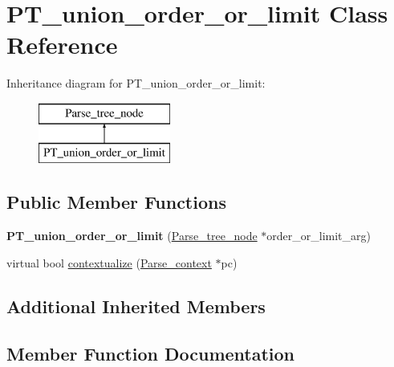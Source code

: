 \hypertarget{classPT__union__order__or__limit}{}\section{P\+T\+\_\+union\+\_\+order\+\_\+or\+\_\+limit Class Reference}
\label{classPT__union__order__or__limit}
Inheritance diagram for P\+T\+\_\+union\+\_\+order\+\_\+or\+\_\+limit\+:\begin{figure}[H]
\begin{center}
\leavevmode
\includegraphics[height=2.000000cm]{classPT__union__order__or__limit}
\end{center}
\end{figure}
\subsection*{Public Member Functions}
\begin{DoxyCompactItemize}
\item 
\mbox{\label{classPT__union__order__or__limit_a85b711d64ff04e855f54aa8a1fc4af20}} 
{\bfseries P\+T\+\_\+union\+\_\+order\+\_\+or\+\_\+limit} (\mbox{\hyperlink{classParse__tree__node}{Parse\+\_\+tree\+\_\+node}} $\ast$order\+\_\+or\+\_\+limit\+\_\+arg)
\item 
virtual bool \mbox{\hyperlink{classPT__union__order__or__limit_a3dea915c0edc923859fc01ad2dd16c5a}{contextualize}} (\mbox{\hyperlink{structParse__context}{Parse\+\_\+context}} $\ast$pc)
\end{DoxyCompactItemize}
\subsection*{Additional Inherited Members}


\subsection{Member Function Documentation}
\mbox{\label{classPT__union__order__or__limit_a3dea915c0edc923859fc01ad2dd16c5a}} 
